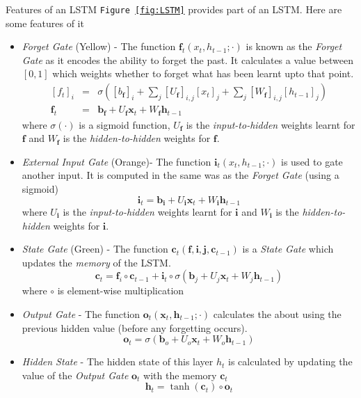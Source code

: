 \documentclass[11pt,a4paper]{article}
\begin{document}
  \begin{proposition}{Features of an LSTM}
    \texttt{Figure \ref{fig:LSTM}} provides part of an LSTM. Here are some features of it
    \begin{itemize}
      \item \textit{Forget Gate} (Yellow) - The function $\mathbf{f}_t(x_t,h_{t-1};\cdot)$ is known as the \textit{Forget Gate} as it encodes the ability to forget the past. It calculates a value between $[0,1]$ which weights whether to forget what has been learnt upto that point.
      \[\begin{array}{rcl}
        [f_t]_i&=&\sigma\left([b_\mathbf{f}]_i+\sum_j[U_\mathbf{f}]_{i,j}[x_t]_j+\sum_j[W_\mathbf{f}]_{i,j}[h_{t-1}]_j\right)\\
        \mathbf{f}_t&=&\mathbf{b}_\mathbf{f}+U_\mathbf{f}\mathbf{x}_t+W_\mathbf{f}\mathbf{h}_{t-1}
      \end{array}\]
      where $\sigma(\cdot)$ is a sigmoid function, $U_\mathbf{f}$ is the \textit{input-to-hidden} weights learnt for $\mathbf{f}$ and $W_\mathbf{f}$ is the \textit{hidden-to-hidden} weights for $\mathbf{f}$.
      \item \textit{External Input Gate} (Orange)- The function $\mathbf{i}_t(x_t,h_{t-1};\cdot)$ is used to gate another input. It is computed in the same was as the \textit{Forget Gate} (using a sigmoid)
      \[ \mathbf{i}_t=\mathbf{b}_\mathbf{i}+U_\mathbf{i}\mathbf{x}_t+W_\mathbf{i}\mathbf{h}_{t-1} \]
      where $U_\mathbf{i}$ is the \textit{input-to-hidden} weights learnt for $\mathbf{i}$ and $W_\mathbf{i}$ is the \textit{hidden-to-hidden} weights for $\mathbf{i}$.
      \item \textit{State Gate} (Green) - The function $\mathbf{c}_t(\mathbf{f},\mathbf{i},\mathbf{j},\mathbf{c}_{t-1})$ is a \textit{State Gate} which updates the \textit{memory} of the LSTM.
      \[ \mathbf{c}_t=\mathbf{f}_i\circ \mathbf{c}_{t-1}+\mathbf{i}_t\circ\sigma\left(\mathbf{b}_j+U_j\mathbf{x}_t+W_j\mathbf{h}_{t-1}\right) \]
      where $\circ$ is element-wise multiplication
      \item \textit{Output Gate} - The function $\mathbf{o}_t(\mathbf{x}_t,\mathbf{h}_{t-1};\cdot)$ calculates the about using the previous hidden value (before any forgetting occurs).
      \[ \mathbf{o}_t=\sigma\left(\mathbf{b}_o+U_o \mathbf{x}_t+W_o \mathbf{h}_{t-1 }\right) \]
      \item \textit{Hidden State} - The hidden state of this layer $h_t$ is calculated by updating the value of the \textit{Output Gate} $\mathbf{o}_t$ with the memory $\mathbf{c}_t$
      \[ \mathbf{h}_t=\tanh(\mathbf{c}_t)\circ \mathbf{o}_t \]
    \end{itemize}
  \end{proposition}
\end{document}
